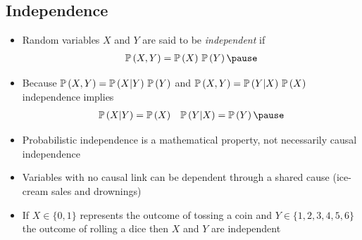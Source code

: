 \begin{slide}
\section[-2.5]{Independence}

\begin{PauseHighLight}
  \begin{itemize}\squeeze
  \item Random variables $X$ and $Y$ are said to be \emph{independent} if
    \begin{align*}
      \Prob{X, Y} = \Prob{X}\,\Prob{Y}\pause
    \end{align*}
  \item Because $\mathbb{P}\left( X,Y \right)= \mathbb{P}\left( X|Y \right)\,\mathbb{P}\left( Y \right)$ and $\mathbb{P}\left( X,Y \right)=
    \mathbb{P}\left( Y|X \right)\,\mathbb{P}\left( X \right)$ independence implies
    \begin{align*}
      \Prob{X|Y} &= \Prob{X} & \Prob{Y|X} = \Prob{Y}\pause
    \end{align*}
  \item Probabilistic independence is a mathematical property, not
    necessarily causal independence\pause
  \item Variables with no causal link can be dependent through a shared
    cause (ice-cream sales and drownings)\pause
  \item If $X\in\{0,1\}$ represents the outcome of tossing a coin and
    $Y\in\{1,2,3,4,5,6\}$ the outcome of rolling a dice then $X$ and $Y$
    are independent\pause
  \end{itemize}
  \vspace*{-1cm}
\end{PauseHighLight}
\end{slide}


